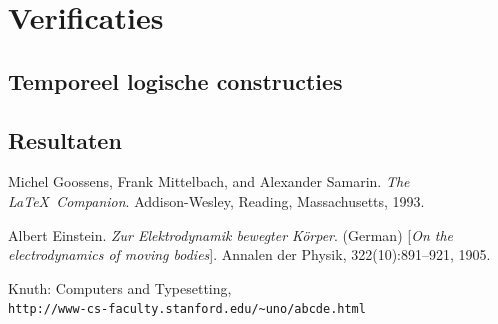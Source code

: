 \documentclass{article}
\begin{document}
\section{Verificaties}
\subsection{Temporeel logische constructies}
\subsection{Resultaten}



\clearpage

\newpage

\newpage
\begin{thebibliography}{9}
Michel Goossens, Frank Mittelbach, and Alexander Samarin. 
\textit{The \LaTeX\ Companion}. 
Addison-Wesley, Reading, Massachusetts, 1993.

Albert Einstein. 
\textit{Zur Elektrodynamik bewegter K{\"o}rper}. (German) 
[\textit{On the electrodynamics of moving bodies}]. 
Annalen der Physik, 322(10):891–921, 1905.

Knuth: Computers and Typesetting,
\\\texttt{http://www-cs-faculty.stanford.edu/\~{}uno/abcde.html}
\end{thebibliography}
\end{document}

